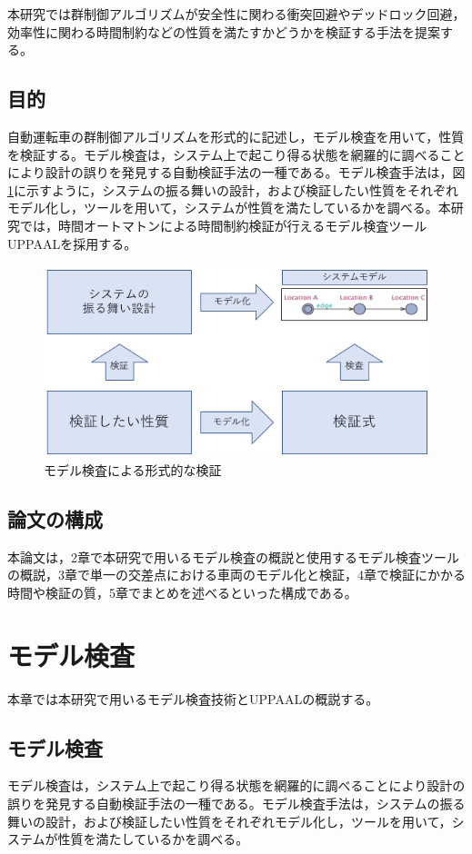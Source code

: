 \documentclass{tpu-sotu}
\begin{document}
	本研究では群制御アルゴリズムが安全性に関わる衝突回避やデッドロック回避，効率性に関わる時間制約などの性質を満たすかどうかを検証する手法を提案する。
	\section{目的}
	自動運転車の群制御アルゴリズムを形式的に記述し，モデル検査を用いて，性質を検証する。モデル検査は，システム上で起こり得る状態を網羅的に調べることにより設計の誤りを発見する自動検証手法の一種である。モデル検査手法は，図\ref{ModelV}に示すように，システムの振る舞いの設計，および検証したい性質をそれぞれモデル化し，ツールを用いて，システムが性質を満たしているかを調べる。本研究では，時間オートマトンによる時間制約検証が行えるモデル検査ツールUPPAAL\cite{u1}を採用する。
	\begin{figure}[htbp]
	\centering
	\includegraphics[width=130mm]{ModelVerification.png}
	\caption{モデル検査による形式的な検証}
	\label{ModelV}
	\end{figure}
	\section{論文の構成}
	本論文は，2章で本研究で用いるモデル検査の概説と使用するモデル検査ツールの概説，3章で単一の交差点における車両のモデル化と検証，4章で検証にかかる時間や検証の質，5章でまとめを述べるといった構成である。
\chapter{モデル検査}
本章では本研究で用いるモデル検査技術\cite{a1}とUPPAALの概説する。
	\section{モデル検査}
	モデル検査は，システム上で起こり得る状態を網羅的に調べることにより設計の誤りを発見する自動検証手法の一種である。モデル検査手法は，システムの振る舞いの設計，および検証したい性質をそれぞれモデル化し，ツールを用いて，システムが性質を満たしているかを調べる。
	
\end{document}
